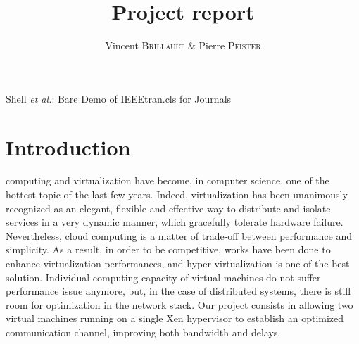 \documentclass[journal]{IEEEtran}
\begin{document}
\title{Project report}

\author{Vincent B\textsc{rillault} \& Pierre P\textsc{fister}}%


%
{Shell \MakeLowercase{\textit{et al.}}: Bare Demo of IEEEtran.cls for Journals}
\maketitle





\begin{abstract}
\boldmath
\end{abstract}
%






\section{Introduction}

 computing and virtualization have become, in computer science, one of the hottest topic of the last few years.
Indeed, virtualization has been unanimously recognized as an elegant, flexible and effective way to distribute and isolate services in a very dynamic manner, which gracefully tolerate hardware failure.
Nevertheless, cloud computing is a matter of trade-off between performance and simplicity.
As a result, in order to be competitive, works have been done to enhance virtualization performances, and hyper-virtualization is one of the best solution.
Individual computing capacity of virtual machines do not suffer performance issue anymore, but, in the case of distributed systems, there is still room for optimization in the network stack.
Our project consists in allowing two virtual machines running on a single Xen hypervisor to establish an optimized communication channel, improving both bandwidth and delays.
\end{document}
